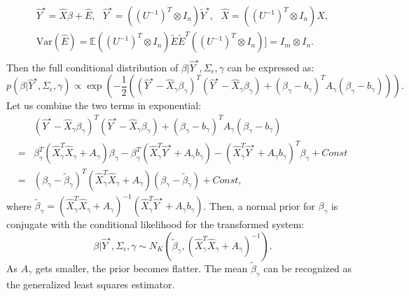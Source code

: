 \documentclass[twoside,11pt]{article}
\begin{document}
\begin{equation} \label{eq:39}
\begin{gathered}
\hat{Y}^\star=\hat{X}\beta+\hat{E},\ \ \  \hat{Y}^\star=((U^{-1})^T\otimes I_n)\tilde{Y}^\star,\ \ \    \hat{X}=((U^{-1})^T\otimes I_n)X,\\
\mathrm{Var}(\hat{E})=\mathbb{E}((U^{-1})^T\otimes I_n)\tilde{E}\tilde{E}^T((U^{-1})^T\otimes I_n)]=I_m\otimes I_n.\\
\end{gathered}
\end{equation}
Then the full conditional distribution of $\beta|\hat{Y}^\star,\Sigma_\epsilon,\gamma$ can be expressed as:
\begin{equation} \label{eq:40}
p(\beta|\hat{Y}^\star,\Sigma_\epsilon,\gamma)\propto \exp\left(-\frac{1}{2}((\hat{Y}^\star-\hat{X}_\gamma \beta_\gamma)^T(\hat{Y}^\star-\hat{X}_\gamma \beta_\gamma)+(\beta_\gamma-b_\gamma)^T A_\gamma(\beta_\gamma-b_\gamma))\right).
\end{equation}
Let us combine the two terms in exponential:
\begin{equation} \label{eq:41}
\begin{split}
&(\hat{Y}^\star-\hat{X}_\gamma \beta_\gamma)^T(\hat{Y}^\star-\hat{X}_\gamma \beta_\gamma)+(\beta_\gamma-b_\gamma)^T A_\gamma(\beta_\gamma-b_\gamma)\\
=&\beta^T_\gamma(\hat{X}_\gamma^T\hat{X}_\gamma+A_\gamma)\beta_\gamma-\beta^T_\gamma(\hat{X}_\gamma^T\hat{Y}^\star+A_\gamma b_\gamma)-(\hat{X}_\gamma^T\hat{Y}^\star+A_\gamma b_\gamma)^T\beta_\gamma+Const \\
=&(\beta_\gamma-\tilde{\beta}_\gamma)^T(\hat{X}_\gamma^T\hat{X}_\gamma+A_\gamma)(\beta_\gamma-\tilde{\beta}_\gamma)+Const,
\end{split}
\end{equation}
where $\tilde{\beta}_\gamma=(\hat{X}_\gamma^T\hat{X}_\gamma+A_\gamma)^{-1}(\hat{X}_\gamma^T\hat{Y}^\star+A_\gamma b_\gamma)$.
Then, a normal prior for $\beta_\gamma$ is conjugate with the conditional likelihood for the transformed system:
\begin{equation} \label{eq:posbeta}
\beta|\hat{Y}^\star,\Sigma_\epsilon,\gamma \sim N_K(\tilde{\beta}_\gamma,(\hat{X}_\gamma^T\hat{X}_\gamma+A_\gamma)^{-1}).
\end{equation}
As $A_\gamma$ gets smaller, the prior becomes flatter. The mean  $\tilde{\beta}_\gamma$ can be recognized as the generalized least squares estimator.
\end{document}
